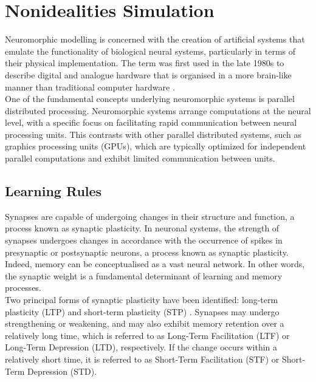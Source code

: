 \section[Nonidealities Simulation]{Nonidealities Simulation}

\noindent Neuromorphic modelling is concerned with the creation of artificial systems that emulate the functionality of biological neural systems, particularly in terms of their physical implementation. The term was first used in the late 1980s to describe digital and analogue hardware that is organised in a more brain-like manner than traditional computer hardware \cite{mead1990neuromorphic}. \\

\noindent One of the fundamental concepts underlying neuromorphic systems is parallel distributed processing. Neuromorphic systems arrange computations at the neural level, with a specific focus on facilitating rapid communication between neural processing units. This contrasts with other parallel distributed systems, such as graphics processing units (GPUs), which are typically optimized for independent parallel computations and exhibit limited communication between units. 

\subsection[Learning Rules]{Learning Rules}

\noindent Synapses are capable of undergoing changes in their structure and function, a process known as synaptic plasticity. In neuronal systems, the strength of synapses undergoes changes in accordance with the occurrence of spikes in presynaptic or postsynaptic neurons, a process known as synaptic plasticity. Indeed, memory can be conceptualised as a vast neural network. In other words, the synaptic weight is a fundamental determinant of learning and memory processes.\\

\noindent Two principal forms of synaptic plasticity have been identified: long-term plasticity (LTP) \cite{bear1994synaptic} and short-term plasticity (STP) \cite{zucker2002short}. Synapses may undergo strengthening or weakening, and may also exhibit memory retention over a relatively long time, which is referred to as Long-Term Facilitation (LTF) or Long-Term Depression (LTD), respectively. If the change occurs within a relatively short time, it is referred to as Short-Term Facilitation (STF) or Short-Term Depression (STD).  \\

